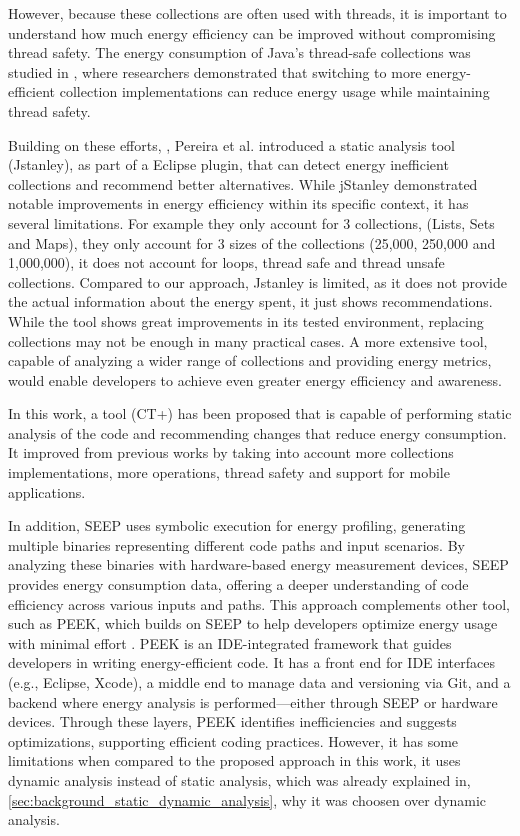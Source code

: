 \documentclass[sigplan]{acmart}
\begin{document}
However, because these collections are often used with threads, it is important to understand how much energy efficiency can be improved without compromising thread safety. The energy consumption of Java's thread-safe collections was studied in \cite{7816451}, where researchers demonstrated that switching to more energy-efficient collection implementations can reduce energy usage while maintaining thread safety.

Building on these efforts, \cite{10.1145/3238147.3240473}, Pereira et al. introduced a static analysis tool (Jstanley), as part of a Eclipse plugin, that can detect energy inefficient collections and recommend better alternatives. While jStanley demonstrated notable improvements in energy efficiency within its specific context, it has several limitations.
For example they only account for 3 collections, (Lists, Sets and Maps), they only account for 3 sizes of the collections (25,000, 250,000 and 1,000,000), it does not account for loops, thread safe and thread unsafe collections. Compared to our approach, Jstanley is limited, as it does not provide the actual information about the energy spent, it just shows recommendations. While the tool shows great improvements in its tested environment, replacing collections may not be enough in many practical cases. A more extensive tool, capable of analyzing a wider range of collections and providing energy metrics, would enable developers to achieve even greater energy efficiency and awareness.

In this work\cite{8816747}, a tool (CT+) has been proposed that is capable of performing static analysis of the code and recommending changes that reduce energy consumption. It improved from previous works by taking into account more collections implementations, more operations, thread safety and support for mobile applications. 

In addition, SEEP \cite{10.1145/2094091.2094106} uses symbolic execution for energy profiling, generating multiple binaries representing different code paths and input scenarios. By analyzing these binaries with hardware-based energy measurement devices, SEEP provides energy consumption data, offering a deeper understanding of code efficiency across various inputs and paths. This approach complements other tool, such as PEEK, which builds on SEEP to help developers optimize energy usage with minimal effort \cite{187026}. PEEK is an IDE-integrated framework that guides developers in writing energy-efficient code. It has a front end for IDE interfaces (e.g., Eclipse, Xcode), a middle end to manage data and versioning via Git, and a backend where energy analysis is performed—either through SEEP or hardware devices. Through these layers, PEEK identifies inefficiencies and suggests optimizations, supporting efficient coding practices. However, it has some limitations when compared to the proposed approach in this work, it uses dynamic analysis instead of static analysis, which was already explained in, \ref{sec:background_static_dynamic_analysis}, why it was choosen over dynamic analysis.
\end{document}
